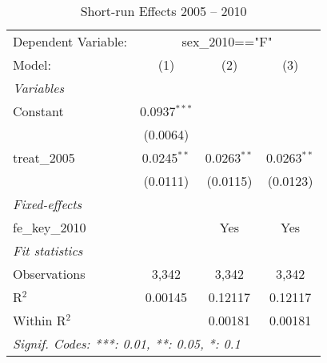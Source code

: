 
\begin{table}[htbp]
   \caption{Short-run Effects 2005 -- 2010}
   \centering
   \begin{tabular}{lccc}
      \tabularnewline \midrule \midrule
      Dependent Variable: & \multicolumn{3}{c}{sex\_2010=="F"}\\
      Model:          & (1)            & (2)           & (3)\\  
      \midrule
      \emph{Variables}\\
      Constant        & 0.0937$^{***}$ &               &   \\   
                      & (0.0064)       &               &   \\   
      treat\_2005     & 0.0245$^{**}$  & 0.0263$^{**}$ & 0.0263$^{**}$\\   
                      & (0.0111)       & (0.0115)      & (0.0123)\\   
      \midrule
      \emph{Fixed-effects}\\
      fe\_key\_2010   &                & Yes           & Yes\\  
      \midrule
      \emph{Fit statistics}\\
      Observations    & 3,342          & 3,342         & 3,342\\  
      R$^2$           & 0.00145        & 0.12117       & 0.12117\\  
      Within R$^2$    &                & 0.00181       & 0.00181\\  
      \midrule \midrule
      \multicolumn{4}{l}{\emph{Signif. Codes: ***: 0.01, **: 0.05, *: 0.1}}\\
   \end{tabular}
\end{table}


